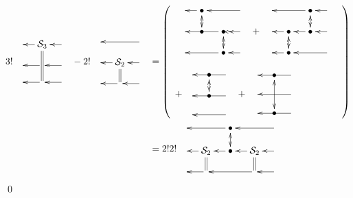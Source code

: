 \begin{align}
3!
\bcen
\xymatrix@R=1pc@C=1pc{
&\cals_3\ar@2{-}[dd]\ar[l]
&\ar[l]
\\
&\ar[l]
&\ar[l]
\\
&\ar[l]
&\ar[l]
}
\ecen
-
2!
\bcen
\xymatrix@R=1pc@C=1pc{
&
&\ar[ll]
\\
&\cals_2\ar@2{-}[d]\ar[l]
&\ar[l]
\\
&\ar[l]
&\ar[l]
}
\ecen
&=
\left(
\begin{array}{l}
\bcen
\xymatrix@R=1pc@C=1pc{
&\bullet\ar@{<->}[d]\ar[l]
&
&\ar[ll]
\\
&\bullet
&\bullet\ar[ll]
\ar\ar@{<->}[d]
&\ar[l]
\\
&
&\bullet\ar[ll]
&\ar[l]
}
\ecen
+
\bcen
\xymatrix@R=1pc@C=1pc{
&
&\bullet\ar@{<->}[d]\ar[ll]
&\ar[l]
\\
&\bullet\ar@{<->}[d]
\ar[l]
&\bullet\ar[l]
&\ar[l]
\\
&\bullet\ar[l]
&
&\ar[ll]
}
\ecen
\\
\\
+
\bcen
\xymatrix@R=1pc@C=1pc{
&\bullet\ar@{<->}[d]
&\ar[ll]
\\
&\bullet
&\ar[ll]
\\
&&\ar[ll]
}
\ecen
+
\bcen
\xymatrix@R=1pc@C=1pc{
&\bullet\ar@{<->}[dd]
&\ar[ll]
\\
&
&\ar[ll]
\\
&\bullet
&\ar[ll]
}
\ecen
\end{array}
\right)
\\
&=
2! 2!
\bcen
\xymatrix@R=1pc@C=1pc{
&
&\bullet\ar[ll]\ar@{<->}[d]
&
&\ar[ll]
\\
&\cals_{2}\ar@2{-}[d]\ar[l]
&\bullet\ar[l]
&\cals_{2}\ar@2{-}[d]\ar[l]
&\ar[l]
\\
&\ar[l]
&&\ar[ll]
&\ar[l]
}
\ecen
\end{align}
\qed

